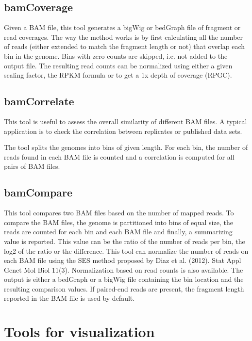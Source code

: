 \documentclass[11pt,a4paper]{article}
\begin{document}
\subsection{bamCoverage}

Given a BAM file, this tool generates a bigWig or bedGraph file of
fragment or read coverages. The way the method works is by first
calculating all the number of reads (either extended to match the
fragment length or not) that overlap each bin in the genome. Bins with
zero counts are skipped, i.e. not added to the output file. The
resulting read counts can be normalized using either a given scaling
factor, the RPKM formula or to get a 1x depth of coverage (RPGC).


\subsection{bamCorrelate}

This tool is useful to assess the overall similarity of different BAM
files. A typical application is to check the correlation between
replicates or published data sets.

The tool splits the genomes into bins of given length. For each bin,
the number of reads found in each BAM file is counted and a
correlation is computed for all pairs of BAM files.


\subsection{bamCompare}

This tool compares two BAM files based on the number of mapped
reads. To compare the BAM files, the genome is partitioned into bins
of equal size, the reads are counted for each bin and each BAM file
and finally, a summarizing value is reported.  This value can be the
ratio of the number of reads per bin, the log2 of the ratio or the
difference.  This tool can normalize the number of reads on each BAM
file using the SES method proposed by Diaz et al.  (2012). Stat Appl
Genet Mol Biol 11(3). Normalization based on read counts is also
available. The output is either a bedGraph or a bigWig file containing
the bin location and the resulting comparison values.  If paired-end
reads are present, the fragment length reported in the BAM file is
used by default.


\section{Tools for visualization}
\end{document}
